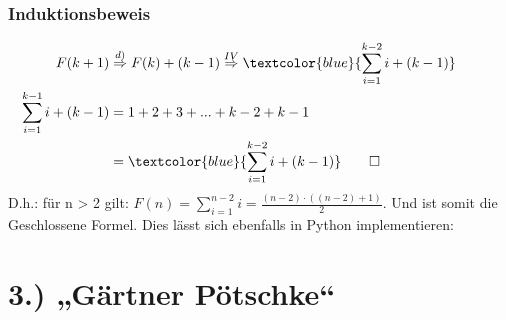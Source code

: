 \documentclass[titlepage]{article}
\begin{document}
		\subsubsection*{Induktionsbeweis}
		\begin{align*}
			F(k+1) &\overset{d)}{\Rightarrow} F(k)+(k-1)\overset{IV}{\Rightarrow} \textcolor{blue}{\sum\limits_{i=1}^{k-2}i+(k-1)} &&&&&&\\
			\sum\limits_{i=1}^{k-1}i+(k-1) &= 1+2+3+...+k-2+k-1\\
			&=\textcolor{blue}{\sum\limits_{i=1}^{k-2}i+(k-1)}\qed\\
		\end{align*}
		D.h.: für n > 2 gilt: $F(n)=\sum\limits_{i=1}^{n-2}i=\frac{(n-2)\cdot((n-2)+1)}{2}$. Und ist somit die Geschlossene Formel. Dies lässt sich ebenfalls in Python implementieren:
		
		
	\section*{3.) „Gärtner Pötschke“}
\end{document}
